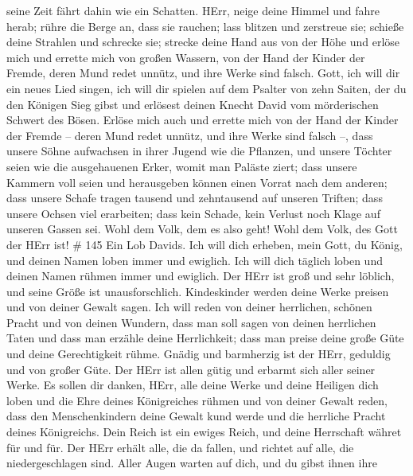 seine Zeit fährt dahin wie ein Schatten.  HErr, neige deine
Himmel und fahre herab; rühre die Berge an, dass sie rauchen;
 lass blitzen und zerstreue sie; schieße deine Strahlen und
schrecke sie;  strecke deine Hand aus von der Höhe und
erlöse mich und errette mich von großen Wassern, von der Hand der Kinder
der Fremde,  deren Mund redet unnütz, und ihre Werke sind
falsch.  Gott, ich will dir ein neues Lied singen, ich will
dir spielen auf dem Psalter von zehn Saiten,  der du den
Königen Sieg gibst und erlösest deinen Knecht David vom mörderischen
Schwert des Bösen.  Erlöse mich auch und errette mich von
der Hand der Kinder der Fremde -- deren Mund redet unnütz, und ihre
Werke sind falsch --,  dass unsere Söhne aufwachsen in
ihrer Jugend wie die Pflanzen, und unsere Töchter seien wie die
ausgehauenen Erker, womit man Paläste ziert;  dass unsere
Kammern voll seien und herausgeben können einen Vorrat nach dem anderen;
dass unsere Schafe tragen tausend und zehntausend auf unseren Triften;
 dass unsere Ochsen viel erarbeiten; dass kein Schade, kein
Verlust noch Klage auf unseren Gassen sei.  Wohl dem Volk,
dem es also geht! Wohl dem Volk, des Gott der HErr ist! \# 145
 Ein Lob Davids. Ich will dich erheben, mein Gott, du König,
und deinen Namen loben immer und ewiglich.  Ich will dich
täglich loben und deinen Namen rühmen immer und ewiglich. 
Der HErr ist groß und sehr löblich, und seine Größe ist unausforschlich.
 Kindeskinder werden deine Werke preisen und von deiner
Gewalt sagen.  Ich will reden von deiner herrlichen, schönen
Pracht und von deinen Wundern,  dass man soll sagen von
deinen herrlichen Taten und dass man erzähle deine Herrlichkeit;
 dass man preise deine große Güte und deine Gerechtigkeit
rühme.  Gnädig und barmherzig ist der HErr, geduldig und von
großer Güte.  Der HErr ist allen gütig und erbarmt sich
aller seiner Werke.  Es sollen dir danken, HErr, alle deine
Werke und deine Heiligen dich loben  und die Ehre deines
Königreiches rühmen und von deiner Gewalt reden,  dass den
Menschenkindern deine Gewalt kund werde und die herrliche Pracht deines
Königreichs.  Dein Reich ist ein ewiges Reich, und deine
Herrschaft währet für und für.  Der HErr erhält alle, die
da fallen, und richtet auf alle, die niedergeschlagen sind.
 Aller Augen warten auf dich, und du gibst ihnen ihre
